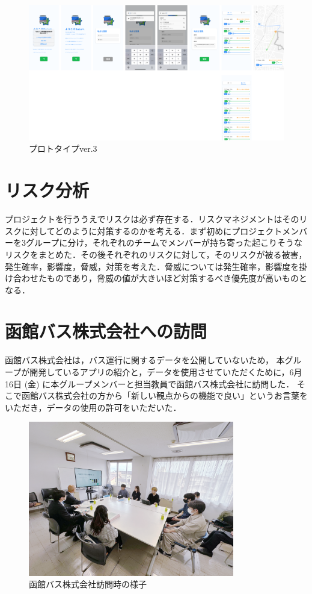 \begin{figure}[H]
    \centering
    \includegraphics[width=14cm]{images/prototype_v4.png}
    \caption{プロトタイプver.3}
    \label{fig:prototype_v3}
\end{figure}

\section{リスク分析}
プロジェクトを行ううえでリスクは必ず存在する．リスクマネジメント\cite{risk}はそのリスクに対してどのように対策するのかを考える．まず初めにプロジェクトメンバーを3グループに分け，それぞれのチームでメンバーが持ち寄った起こりそうなリスクをまとめた．その後それぞれのリスクに対して，そのリスクが被る被害，発生確率，影響度，脅威，対策を考えた．脅威については発生確率，影響度を掛け合わせたものであり，脅威の値が大きいほど対策するべき優先度が高いものとなる．

\section{函館バス株式会社への訪問}
函館バス株式会社は，バス運行に関するデータを公開していないため，
本グループが開発しているアプリの紹介と，データを使用させていただくために，6月16日 (金) に本グループメンバーと担当教員で函館バス株式会社に訪問した．
そこで函館バス株式会社の方から「新しい観点からの機能で良い」というお言葉をいただき，データの使用の許可をいただいた．

\begin{figure}[H]
    \centering
    \includegraphics[width=9cm]{images/hakodate_bus.png}
    \caption{函館バス株式会社訪問時の様子}
    \label{fig:hakodate_bus}
\end{figure}

